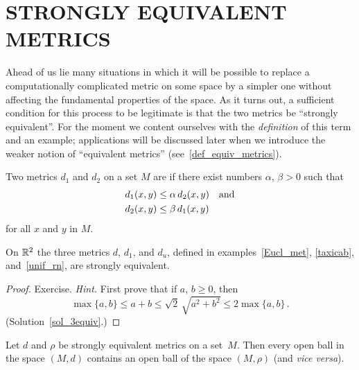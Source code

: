 \section{STRONGLY EQUIVALENT METRICS}
Ahead of us lie many situations in which it will be possible to replace a computationally
complicated metric on some space by a simpler one without affecting the fundamental
properties of the space. As it turns out, a sufficient condition for this process to be
legitimate is that the two metrics be ``strongly equivalent''.  For the moment we content
ourselves with the \emph{definition} of this term and an example; applications will be
discussed later when we introduce the weaker notion of ``equivalent metrics''
(see~\ref{def_equiv_metrics}).

\begin{defn} Two metrics $d_1$ and $d_2$ on a set $M$ are
 if there exist numbers $\alpha$, $\beta > 0$ such that
 \begin{align*}
     d_1(x,y) &\le \alpha\, d_2(x,y) \text{\quad and} \\
     d_2(x,y) &\le \beta\, d_1(x,y)
 \end{align*}
for all $x$ and $y$ in $M$.
\end{defn}

\begin{prop}\label{3equiv} On $\mathbb{R}^2$ the three metrics $d$, $d_1$, and $d_u$, defined in
examples~\ref{Eucl_met}, \ref{taxicab}, and~\ref{unif_rn}, are strongly equivalent.
\end{prop}

\begin{proof} Exercise. \emph{Hint.}  First prove that if $a$, $b \ge 0$, then
   \[ \max\{a,b\} \le a+b \le \sqrt 2 \,\sqrt{a^2+b^2} \le 2 \max \{a,b\}\,.\]
(Solution~\ref{sol_3equiv}.)   \ns
\end{proof}

\begin{prob} Let $d$ and $\rho$ be strongly equivalent metrics on a set~$M$. Then every
open ball in the space $(M,d)$ contains an open ball of the space $(M,\rho)$ (and
\emph{vice versa}).
\end{prob}

